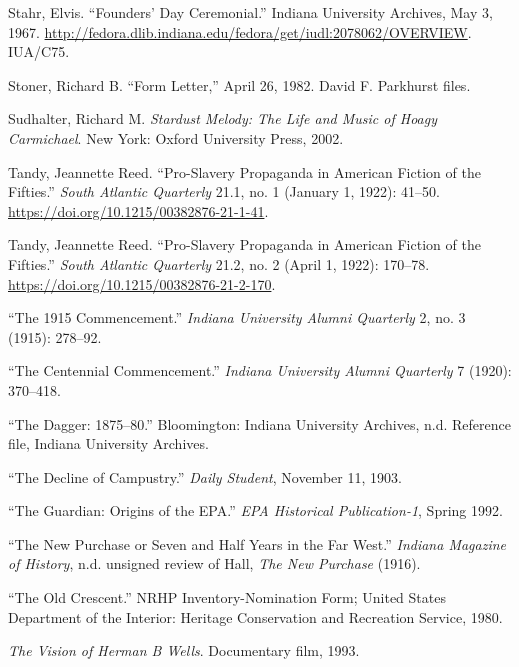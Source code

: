\documentclass[
  american,
  letterpaper,
]{scrreprt}
\newlength{\cslhangindent}
\newenvironment{CSLReferences}[2] %
 {\begin{list}{}{%
  \setlength{\itemindent}{0pt}
  \setlength{\leftmargin}{0pt}
  \setlength{\parsep}{0pt}
  \ifodd #1
   \setlength{\leftmargin}{\cslhangindent}
   \setlength{\itemindent}{-1\cslhangindent}
  \fi
  \setlength{\itemsep}{#2\baselineskip}}}
 {\end{list}}
\begin{document}
\begin{CSLReferences}{1}{0}
Stahr, Elvis. {``Founders' Day Ceremonial.''} Indiana University
Archives, May 3, 1967.
\url{http://fedora.dlib.indiana.edu/fedora/get/iudl:2078062/OVERVIEW}.
IUA/C75.

Stoner, Richard B. {``Form Letter,''} April 26, 1982. David F. Parkhurst
files.

Sudhalter, Richard M. \emph{Stardust Melody: The Life and Music of Hoagy
Carmichael}. New York: Oxford University Press, 2002.

Tandy, Jeannette Reed. {``Pro-Slavery Propaganda in American Fiction of
the Fifties.''} \emph{South Atlantic Quarterly} 21.1, no. 1 (January 1,
1922): 41--50. \url{https://doi.org/10.1215/00382876-21-1-41}.

Tandy, Jeannette Reed. {``Pro-Slavery Propaganda in American Fiction of
the Fifties.''} \emph{South Atlantic Quarterly} 21.2, no. 2 (April 1,
1922): 170--78. \url{https://doi.org/10.1215/00382876-21-2-170}.

{``The 1915 Commencement.''} \emph{Indiana University Alumni Quarterly}
2, no. 3 (1915): 278--92.

{``The Centennial Commencement.''} \emph{Indiana University Alumni
Quarterly} 7 (1920): 370--418.

{``The Dagger: 1875--80.''} Bloomington: Indiana University Archives,
n.d. Reference file, Indiana University Archives.

{``The Decline of Campustry.''} \emph{Daily Student}, November 11, 1903.

{``The Guardian: Origins of the EPA.''} \emph{EPA Historical
Publication-1}, Spring 1992.

{``The New Purchase or Seven and Half Years in the Far West.''}
\emph{Indiana Magazine of History}, n.d. unsigned review of Hall,
\emph{The New Purchase} (1916).

{``The Old Crescent.''} NRHP Inventory-Nomination Form; United States
Department of the Interior: Heritage Conservation and Recreation
Service, 1980.

\emph{The Vision of Herman {B} Wells}. Documentary film, 1993.


\end{CSLReferences}
\end{document}
